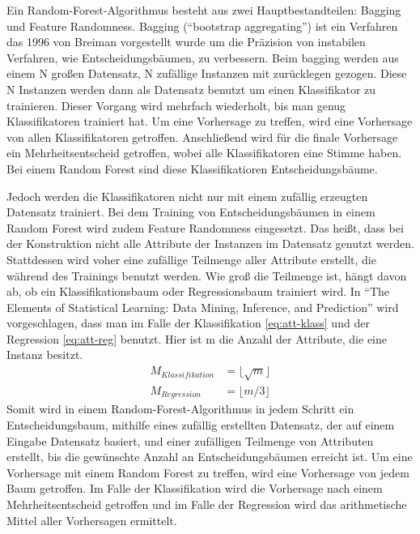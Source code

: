 Ein Random-Forest-Algorithmus besteht aus zwei Hauptbestandteilen: Bagging~\cite{breiman1996bagging} und
Feature Randomness.
Bagging (\enquote{bootstrap aggregating}) ist ein Verfahren das 1996 von Breiman vorgestellt wurde um
die Präzision von instabilen Verfahren, wie Entscheidungsbäumen, zu verbessern.
Beim bagging werden aus einem N großen Datensatz, N zufällige Instanzen mit zurücklegen gezogen.
Diese N Instanzen werden dann als Datensatz benutzt um einen Klassifikator zu trainieren. Dieser Vorgang
wird mehrfach wiederholt, bis man genug Klassifikatoren trainiert hat.
Um eine Vorhersage zu treffen, wird eine Vorhersage von allen Klassifikatoren getroffen. Anschließend
wird für die finale Vorhersage ein Mehrheitsentscheid getroffen, wobei alle Klassifikatoren eine Stimme haben.
Bei einem Random Forest sind diese Klassifikatioren Entscheidungsbäume.

Jedoch werden die Klassifikatoren nicht nur mit einem zufällig erzeugten Datensatz trainiert.
Bei dem Training von Entscheidungsbäumen in einem Random Forest wird zudem Feature Randomness eingesetzt.
Das heißt, dass bei der Konstruktion nicht alle Attribute der Instanzen im Datensatz genutzt werden.
Stattdessen wird voher eine zufällige Teilmenge aller Attribute erstellt, die während des Trainings benutzt werden.
Wie groß die Teilmenge ist, hängt davon ab, ob ein Klassifikationsbaum oder Regressionsbaum trainiert wird.
In \enquote{The Elements of Statistical Learning: Data Mining, Inference, and Prediction} wird vorgeschlagen,
dass man im Falle der Klassifikation \cref{eq:att-klass} und der Regression \cref{eq:att-reg} benutzt.
Hier ist m die Anzahl der Attribute, die eine Instanz besitzt.
\begin{align}
    M_{Klassifikation}       & = \lfloor\sqrt{m}\rfloor \label{eq:att-klass} \\
    M_{Regression}       & = \lfloor{m/3}\rfloor \label{eq:att-reg}
  \end{align}
Somit wird in einem Random-Forest-Algorithmus in jedem Schritt ein Entscheidungsbaum, mithilfe eines zufällig
erstellten Datensatz, der auf einem Eingabe Datensatz basiert, und einer zufälligen Teilmenge von Attributen erstellt,
bis die gewünschte Anzahl an Entscheidungsbäumen erreicht ist.
Um eine Vorhersage mit einem Random Forest zu treffen, wird eine Vorhersage von jedem Baum getroffen.
Im Falle der Klassifikation wird die Vorhersage nach einem Mehrheitsentscheid getroffen und im Falle der Regression
wird das arithmetische Mittel aller Vorhersagen ermittelt.

